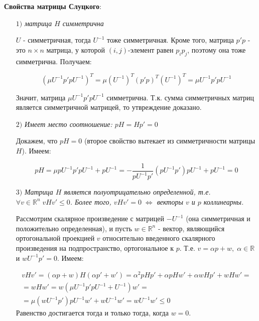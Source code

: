\textbf{Свойства матрицы Слуцкого}:
\begin{itemize}
	\item[$1)$]
		\textit{матрица $H$ симметрична}
		\begin{Proof}
			$U$ - симметричная, тогда $U^{-1}$ тоже симметричная. Кроме того, матрица $p' p$ - это $n \times n$ матрица, у которой $(i, j)$-элемент равен $p_i p_j$, поэтому она тоже симметрична. Получаем:

			$$(\mu U^{-1} p' p U^{-1})^T = \mu (U^{-1})^T (p' p)^T (U^{-1})^T = \mu U^{-1} p' p U^{-1}$$

			Значит, матрица $\mu U^{-1} p' p U^{-1}$ симметрична. Т.к. сумма симметричных матриц является симметричной матрицей, то утвреждение доказано.
		\end{Proof}
	\item[$2)$]
		\textit{Имеет место соотношение: $p H = H p' = 0$}
		\begin{Proof}
			Докажем, что $p H = 0$ (второе свойство вытекает из симметричности матрицы $H$). Имеем:

			$$pH = \mu p U^{-1} p' p U^{-1} + p U^{-1} = -\frac{1}{p U^{-1}p'} (p U^{-1} p') p U^{-1} + p U^{-1} = 0$$
		\end{Proof}
	\item[$3)$]
		\textit{Матрица $H$ является полуотрицательно определенной, т.е. $\forall v \in \mathbb{R}^n \; v H v' \le 0$. Более того, $v H v' = 0 \; \Leftrightarrow$ векторы $v$ и $p$ коллинеарны.}
		\begin{Proof}
			Рассмотрим скалярное произведение с матрицей $-U^{-1}$ (она симметричная и положительно определенная), и пусть $w \in \mathbb{R}^n$ - вектор, являющийся ортогональной проекцией $v$ относительно введенного скалярного произведения на подпространство, ортогональное к $p$. Т.е. $v = \alpha p + w, \; \alpha \in \mathbb{R}$ и $w U^{-1} p' = 0$. Имеем:

			$$\begin{gathered}
				vHv' = (\alpha p + w)H(\alpha p' + w') = \alpha^2 pHp' + \alpha pHw' + \alpha wHp' + wHw' = \\
				= wHw' = w (\mu U^{-1} p' p U^{-1} + U^{-1}) w' = \\
				= \mu (w U^{-1}p')pU^{-1}w' + w U^{-1}w' = w U^{-1} w' \le 0
			\end{gathered}$$
			Равенство достигается тогда и только тогда, когда $w = 0$.
		\end{Proof}
\end{itemize}

